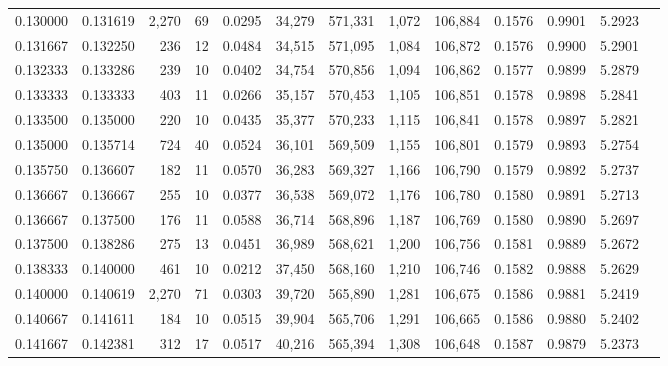 \begin{tabular}{rrrrrrrrrrrrr}
0.130000 & 0.131619 & 2,270 &  69 &                                     0.0295 &  34,279 & 571,331 &   1,072 & 106,884 & 0.1576 & 0.9901 & 5.2923 \\
0.131667 & 0.132250 &   236 &  12 &                                     0.0484 &  34,515 & 571,095 &   1,084 & 106,872 & 0.1576 & 0.9900 & 5.2901 \\
0.132333 & 0.133286 &   239 &  10 &                                     0.0402 &  34,754 & 570,856 &   1,094 & 106,862 & 0.1577 & 0.9899 & 5.2879 \\
0.133333 & 0.133333 &   403 &  11 &                                     0.0266 &  35,157 & 570,453 &   1,105 & 106,851 & 0.1578 & 0.9898 & 5.2841 \\
0.133500 & 0.135000 &   220 &  10 &                                     0.0435 &  35,377 & 570,233 &   1,115 & 106,841 & 0.1578 & 0.9897 & 5.2821 \\
0.135000 & 0.135714 &   724 &  40 &                                     0.0524 &  36,101 & 569,509 &   1,155 & 106,801 & 0.1579 & 0.9893 & 5.2754 \\
0.135750 & 0.136607 &   182 &  11 &                                     0.0570 &  36,283 & 569,327 &   1,166 & 106,790 & 0.1579 & 0.9892 & 5.2737 \\
0.136667 & 0.136667 &   255 &  10 &                                     0.0377 &  36,538 & 569,072 &   1,176 & 106,780 & 0.1580 & 0.9891 & 5.2713 \\
0.136667 & 0.137500 &   176 &  11 &                                     0.0588 &  36,714 & 568,896 &   1,187 & 106,769 & 0.1580 & 0.9890 & 5.2697 \\
0.137500 & 0.138286 &   275 &  13 &                                     0.0451 &  36,989 & 568,621 &   1,200 & 106,756 & 0.1581 & 0.9889 & 5.2672 \\
0.138333 & 0.140000 &   461 &  10 &                                     0.0212 &  37,450 & 568,160 &   1,210 & 106,746 & 0.1582 & 0.9888 & 5.2629 \\
0.140000 & 0.140619 & 2,270 &  71 &                                     0.0303 &  39,720 & 565,890 &   1,281 & 106,675 & 0.1586 & 0.9881 & 5.2419 \\
0.140667 & 0.141611 &   184 &  10 &                                     0.0515 &  39,904 & 565,706 &   1,291 & 106,665 & 0.1586 & 0.9880 & 5.2402 \\
0.141667 & 0.142381 &   312 &  17 &                                     0.0517 &  40,216 & 565,394 &   1,308 & 106,648 & 0.1587 & 0.9879 & 5.2373 \\

\end{tabular}
